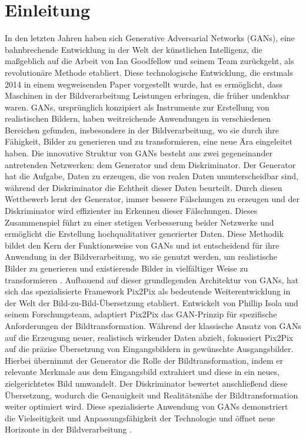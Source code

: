 \chapter{Einleitung}
In den letzten Jahren haben sich Generative Adversarial Networks (GANs), eine bahnbrechende Entwicklung in der Welt der künstlichen Intelligenz, die maßgeblich auf die Arbeit von Ian Goodfellow und seinem Team zurückgeht, als revolutionäre Methode etabliert. Diese technologische Entwicklung, die erstmals 2014 in einem wegweisenden Paper vorgestellt wurde, hat es ermöglicht, dass Maschinen in der Bildverarbeitung Leistungen erbringen, die früher undenkbar waren. GANs, ursprünglich konzipiert als Instrumente zur Erstellung von realistischen Bildern, haben weitreichende Anwendungen in verschiedenen Bereichen gefunden, insbesondere in der Bildverarbeitung, wo sie durch ihre Fähigkeit, Bilder zu generieren und zu transformieren, eine neue Ära eingeleitet haben. \newline
Die innovative Struktur von GANs besteht aus zwei gegeneinander antretenden Netzwerken: dem Generator und dem Diskriminator. Der Generator hat die Aufgabe, Daten zu erzeugen, die von realen Daten ununterscheidbar sind, während der Diskriminator die Echtheit dieser Daten beurteilt. Durch diesen Wettbewerb lernt der Generator, immer bessere Fälschungen zu erzeugen und der Diskriminator wird effizienter im Erkennen dieser Fälschungen. Dieses Zusammenspiel führt zu einer stetigen Verbesserung beider Netzwerke und ermöglicht die Erstellung hochqualitativer generierter Daten. Diese Methodik bildet den Kern der Funktionsweise von GANs und ist entscheidend für ihre Anwendung in der Bildverarbeitung, wo sie genutzt werden, um realistische Bilder zu generieren und existierende Bilder in vielfältiger Weise zu transformieren \cite{IanJ.GoodfellowJeanPougetAbadieMehdiMirzaBingXuDavidWardeFarleySherjilOzairAaro.2014}.
\newline
Aufbauend auf dieser grundlegenden Architektur von GANs, hat sich das spezialisierte Framework Pix2Pix als bedeutende Weiterentwicklung in der Welt der Bild-zu-Bild-Übersetzung etabliert. Entwickelt von Phillip Isola und seinem Forschungsteam, adaptiert Pix2Pix das GAN-Prinzip für spezifische Anforderungen der Bildtransformation. Während der klassische Ansatz von GANs auf die Erzeugung neuer, realistisch wirkender Daten abzielt, fokussiert Pix2Pix auf die präzise Übersetzung von Eingangsbildern in gewünschte Ausgangsbilder. Hierbei übernimmt der Generator die Rolle der Bildtransformation, indem er relevante Merkmale aus dem Eingangsbild extrahiert und diese in ein neues, zielgerichtetes Bild umwandelt. Der Diskriminator bewertet anschließend diese Übersetzung, wodurch die Genauigkeit und Realitätsnähe der Bildtransformation weiter optimiert wird. Diese spezialisierte Anwendung von GANs demonstriert die Vielseitigkeit und Anpassungsfähigkeit der Technologie und öffnet neue Horizonte in der Bildverarbeitung \cite{PhillipIsola.}.
